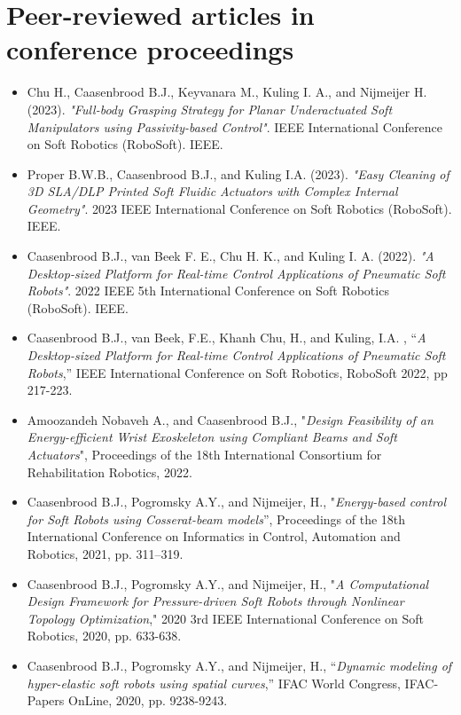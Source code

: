 \section*{Peer-reviewed articles in conference proceedings}
\begin{itemize}[leftmargin=2mm]
\item Chu H., Caasenbrood B.J., Keyvanara M., Kuling I. A., and Nijmeijer H. (2023). \textit{"Full-body Grasping Strategy for Planar Underactuated Soft Manipulators using Passivity-based Control"}. IEEE International Conference on Soft Robotics (RoboSoft). IEEE.
\item Proper B.W.B., Caasenbrood B.J., and Kuling I.A. (2023). \textit{"Easy Cleaning of 3D SLA/DLP Printed Soft Fluidic Actuators with Complex Internal Geometry"}. 2023 IEEE International Conference on Soft Robotics (RoboSoft). IEEE.
\item Caasenbrood B.J., van Beek F. E., Chu H. K., and Kuling I. A. (2022). \textit{"A Desktop-sized Platform for Real-time Control Applications of Pneumatic Soft Robots"}. 2022 IEEE 5th International Conference on Soft Robotics (RoboSoft). IEEE. 
\item Caasenbrood B.J., van Beek, F.E., Khanh Chu, H., and Kuling, I.A. , “\textit{A Desktop-sized Platform for Real-time Control Applications of Pneumatic Soft Robots},” IEEE International Conference on Soft Robotics, RoboSoft 2022, pp 217-223.
\item Amoozandeh Nobaveh A., and Caasenbrood B.J., "\textit{Design Feasibility of an Energy-efficient Wrist Exoskeleton
using Compliant Beams and Soft Actuators}", Proceedings of the 18th International  Consortium for Rehabilitation Robotics, 2022.
\item  Caasenbrood B.J., Pogromsky A.Y., and Nijmeijer, H., "\textit{Energy-based control for Soft Robots using Cosserat-beam models}”, Proceedings of the 18th International Conference on Informatics in Control, Automation and Robotics, 2021, pp. 311–319.
\item Caasenbrood B.J., Pogromsky A.Y., and Nijmeijer, H., "\textit{A Computational Design Framework for Pressure-driven Soft Robots through Nonlinear Topology Optimization}," 2020 3rd IEEE International Conference on Soft Robotics, 2020, pp. 633-638.
\item Caasenbrood B.J., Pogromsky A.Y., and Nijmeijer, H., “\textit{Dynamic modeling of hyper-elastic soft robots using spatial curves},” IFAC World Congress, IFAC-Papers OnLine, 2020, pp. 9238-9243.
\end{itemize}

